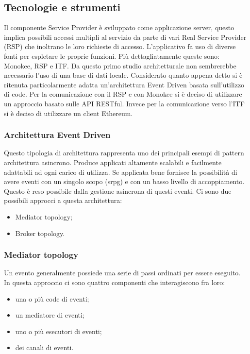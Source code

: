 \subsection{Tecnologie e strumenti}
\label{sec:tecnologie-strumenti}
Il componente Service Provider è sviluppato come applicazione server, questo implica possibili accessi multipli al servizio da parte di vari Real Service Provider (RSP) che inoltrano le loro richieste di accesso. L’applicativo fa uso di diverse fonti per espletare le proprie funzioni. Più dettagliatamente queste sono: Monokee, RSP e ITF. Da questo primo studio architetturale non sembrerebbe necessario l’uso di una base di dati locale.  Considerato quanto appena detto si è ritenuta particolarmente adatta un’architettura Event Driven basata sull’utilizzo di code. Per la comunicazione con il RSP e con Monokee si è deciso di utilizzare un approccio basato sulle API RESTful. Invece per la comunicazione verso l’ITF si è deciso di utilizzare un client Ethereum.

\subsubsection{Architettura Event Driven}
Questo tipologia di architettura rappresenta uno dei principali esempi di pattern architettura asincrono. Produce applicati altamente scalabili e facilmente adattabili ad ogni carico di utilizza. Se applicata bene fornisce la possibilità di avere eventi con un singolo scopo (\gls{srpg}\glsfirstoccur) e con un basso livello di accoppiamento. Questo è reso possibile dalla gestione asincrona di questi eventi.
Ci sono due possibili approcci a questa architettura:
\begin{itemize}
    \item Mediator topology;
    \item Broker topology.
\end{itemize}
\subsubsection{Mediator topology}
Un evento generalmente possiede una serie di passi ordinati per essere eseguito. In questa approccio ci sono quattro componenti che interagiscono fra loro:
\begin{itemize}
    \item una o più code di eventi;
    \item un mediatore di eventi;
    \item uno o più esecutori di eventi;
    \item dei canali di eventi.
\end{itemize}
    
